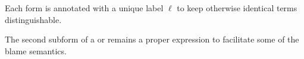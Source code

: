 \documentclass{sigplanconf}
\begin{document}
Each  form is annotated with a unique label $\ell$ to keep otherwise identical terms distinguishable.

The second subform of a  or  remains a proper expression to facilitate some of the blame semantics.

\newcommand{\vx}[0]{\mathbf{x}}

\newcommand{\appe}[2]{(#1\,#2)}
\newcommand{\lame}[2]{(\lambda\,(#1)\,#2)}
\newcommand{\chae}[2]{(\mathit{chaperone\mhyphen operator}\,#1\,#2)^\ell}
\newcommand{\impe}[2]{(\mathit{impersonate\mhyphen operator}\,#1\,#2)}
\newcommand{\lete}[3]{(\mathbf{let}\,((#1)\,#2)\,#3)}
\newcommand{\letrece}[3]{(\mathbf{letrec}\,((#1)\,#2)\,#3)}
\newcommand{\ife}[3]{(\mathbf{if}\,#1\,#2\,#3)}

\newcommand{\ande}[2]{(\mathrm{and}\,#1\,#2)}
\newcommand{\ore}[2]{(\mathrm{or}\,#1\,#2)}
\end{document}
